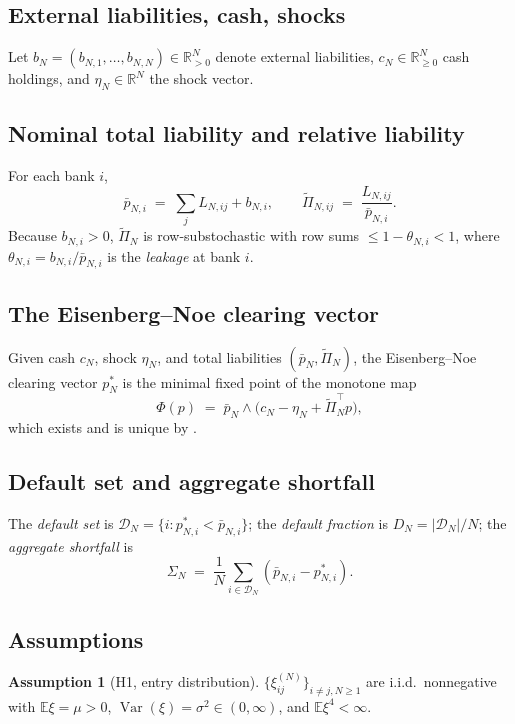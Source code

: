 \documentclass[11pt,a4paper]{article}
\theoremstyle{definition}
\newtheorem{assumption}[theorem]{Assumption}
\newcommand{\SigmaN}{\Sigma_N}
\newcommand{\Dcal}{\mathcal{D}}
\DeclareMathOperator{\Var}{Var}
\begin{document}
\subsection{External liabilities, cash, shocks}

Let $b_N = (b_{N,1},\dots,b_{N,N})\in\mathbb{R}^N_{>0}$ denote external
liabilities, $c_N\in\mathbb{R}^N_{\geq 0}$ cash holdings, and
$\eta_N\in\mathbb{R}^N$ the shock vector.

\subsection{Nominal total liability and relative liability}

For each bank $i$,
\[
\bar p_{N,i} \;=\; \sum_{j}L_{N,ij} + b_{N,i},
\qquad
\widetilde\Pi_{N,ij} \;=\; \frac{L_{N,ij}}{\bar p_{N,i}}.
\]
Because $b_{N,i}>0$, $\widetilde\Pi_N$ is row-substochastic with row sums
$\leq 1-\theta_{N,i}<1$, where $\theta_{N,i} = b_{N,i}/\bar p_{N,i}$ is the
\emph{leakage} at bank $i$.

\subsection{The Eisenberg--Noe clearing vector}

Given cash $c_N$, shock $\eta_N$, and total liabilities
$(\bar p_N,\widetilde\Pi_N)$, the Eisenberg--Noe clearing vector $p^\ast_N$ is
the minimal fixed point of the monotone map
\[
\Phi(p) \;=\; \bar p_N \wedge \bigl(c_N - \eta_N + \widetilde\Pi_N^\top p\bigr),
\]
which exists and is unique by \cite[Theorem~2]{EisenbergNoe2001}.

\subsection{Default set and aggregate shortfall}

The \emph{default set} is $\Dcal_N = \{i : p^\ast_{N,i}<\bar p_{N,i}\}$; the
\emph{default fraction} is $D_N = |\Dcal_N|/N$; the \emph{aggregate shortfall} is
\[
\SigmaN \;=\; \frac{1}{N}\sum_{i\in\Dcal_N}(\bar p_{N,i} - p^\ast_{N,i}).
\]

\subsection{Assumptions}

\begin{assumption}[H1, entry distribution]
\label{ass:H1}
$\{\xi^{(N)}_{ij}\}_{i\neq j,N\geq 1}$ are i.i.d.\ nonnegative with
$\mathbb E\xi = \mu > 0$, $\Var(\xi) = \sigma^2\in(0,\infty)$, and
$\mathbb E\xi^4 < \infty$.
\end{assumption}
\end{document}
